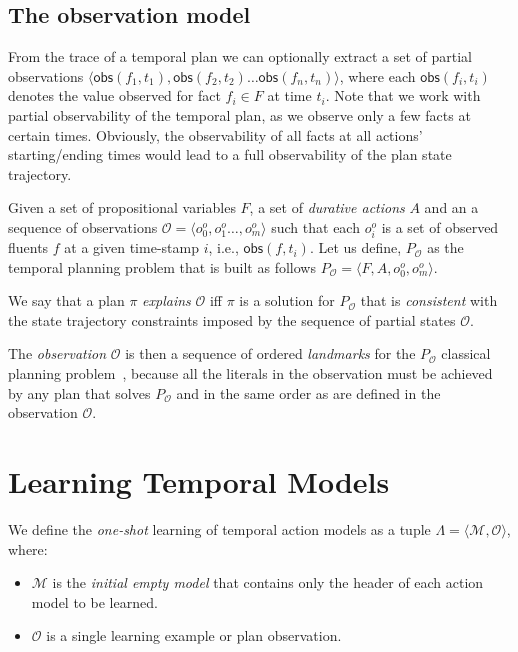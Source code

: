 \documentclass[runningheads]{llncs}
\newcommand{\tup}[1]{{\langle #1 \rangle}}
\newcommand{\obs}{\mathsf{obs}}    %
\begin{document}
\subsection{The observation model}
\label{sec:omodel}

From the trace of a temporal plan we can optionally extract a set of partial observations $\tup{\obs(f_1,t_1),\obs(f_2,t_2)\ldots \obs(f_n,t_n)}$, where each $\obs(f_i,t_i)$ denotes the value observed for fact $f_i \in F$ at time $t_i$. Note that we work with partial observability of the temporal plan, as we observe only a few facts at certain times. Obviously, the observability of all facts at all actions' starting/ending times would lead to a full observability of the plan state trajectory.

Given a set of propositional variables $F$, a set of {\em durative actions} $A$ and an a sequence of observations $\mathcal{O}=\tup{o_0^o,o_1^o \ldots , o_m^o}$ such that each $o_i^o$ is a set of observed fluents $f$ at a given time-stamp $i$, i.e., $\obs(f,t_i)$. Let us define, $P_\mathcal{O}$ as the temporal planning problem that is built as follows $P_\mathcal{O}=\tup{F,A,o_0^o,o_m^o}$. 
\begin{definition}[Explanation]
We say that a plan $\pi$ {\em explains} $\mathcal{O}$ iff $\pi$ is a solution for $P_\mathcal{O}$ that is {\em consistent} with the state trajectory constraints imposed by the sequence of partial states $\mathcal{O}$.
\end{definition}

The {\em observation} $\mathcal{O}$ is then a sequence of ordered {\em landmarks} for the $P_\mathcal{O}$ classical planning problem~\cite{hoffmann2004ordered}, because all the literals in the observation must be achieved by any plan that solves $P_\mathcal{O}$ and in the same order as are defined in the observation $\mathcal{O}$.



\section{Learning Temporal Models}
\label{sec:learning}

We define the {\em one-shot} learning of temporal action models as a tuple $\Lambda=\tup{\mathcal{M},{\mathcal O}}$, where:

\begin{itemize}
\item $\mathcal{M}$ is the {\em initial empty model} that contains only the header of each action model to be learned.
\item $\mathcal{O}$ is a single learning example or plan observation.
\end{itemize}
\end{document}
